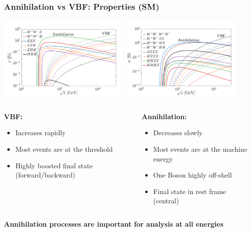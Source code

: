 \documentclass[aspectratio=169]{beamer}
\begin{document}
\begin{frame}
	\frametitle{Annihilation vs VBF: Properties (SM)}
	\includegraphics[width=0.48\textwidth]{figs/BBB_SM.pdf}
	\includegraphics[width=0.46\textwidth]{figs/BBBB_SM.pdf}
	\begin{columns}
		\begin{column}{0.48\textwidth}
			\textcolor{PittRoyal}{\bf VBF:}
			\begin{itemize}
				\item Increases rapidly
				\item Most events are at the threshold
				\item Highly boosted final state (\textcolor{PittRoyal}{forward/backward})
			\end{itemize}
		\end{column}
		\begin{column}{0.48\textwidth}
			\textcolor{PittRoyal}{\bf Annihilation:}
			\begin{itemize}
				\item Decreases slowly
				\item Most events are at the machine energy
				\item One Boson highly off-shell
				\item  Final state in rest frame (\textcolor{PittRoyal}{central})
			\end{itemize}
		\end{column}
	\end{columns}
	\hspace{3mm}\textcolor{PittGold}{\bf Annihilation processes are important for analysis at all energies}
\end{frame}
\end{document}
